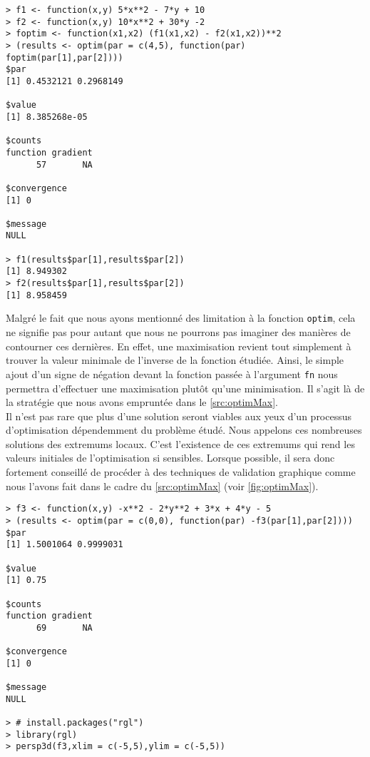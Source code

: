 \begin{lstlisting}[caption = Optimisation générique avec R,label=src:optim]
> f1 <- function(x,y) 5*x**2 - 7*y + 10
> f2 <- function(x,y) 10*x**2 + 30*y -2
> foptim <- function(x1,x2) (f1(x1,x2) - f2(x1,x2))**2
> (results <- optim(par = c(4,5), function(par) foptim(par[1],par[2])))
$par
[1] 0.4532121 0.2968149

$value
[1] 8.385268e-05

$counts
function gradient 
      57       NA 

$convergence
[1] 0

$message
NULL

> f1(results$par[1],results$par[2])
[1] 8.949302
> f2(results$par[1],results$par[2])
[1] 8.958459
\end{lstlisting}

\vspace{\baselineskip}
Malgré le fait que nous ayons mentionné des limitation à la fonction \texttt{optim}, cela ne signifie pas pour autant que nous ne pourrons pas imaginer des manières de contourner ces dernières. En effet, une maximisation revient tout simplement à trouver la valeur minimale de l'inverse de la fonction étudiée. Ainsi, le simple ajout d'un signe de négation devant la fonction passée à l'argument \texttt{fn} nous permettra d'effectuer une maximisation plutôt qu'une minimisation. Il s'agit là de la stratégie que nous avons empruntée dans le \autoref{src:optimMax}. \\

Il n'est pas rare que plus d'une solution seront viables aux yeux d'un processus d'optimisation dépendemment du problème étudé. Nous appelons ces nombreuses solutions des extremums locaux. C'est l'existence de ces extremums qui rend les valeurs initiales de l'optimisation si sensibles. Lorsque possible, il sera donc fortement conseillé de procéder à des techniques de validation graphique comme nous l'avons fait dans le cadre du \autoref{src:optimMax} (voir \autoref{fig:optimMax}). \\

\begin{lstlisting}[caption = Maximisation d'une fonction avec \texttt{optim},label=src:optimMax]
> f3 <- function(x,y) -x**2 - 2*y**2 + 3*x + 4*y - 5
> (results <- optim(par = c(0,0), function(par) -f3(par[1],par[2])))
$par
[1] 1.5001064 0.9999031

$value
[1] 0.75

$counts
function gradient 
      69       NA 

$convergence
[1] 0

$message
NULL

> # install.packages("rgl")
> library(rgl)
> persp3d(f3,xlim = c(-5,5),ylim = c(-5,5))
\end{lstlisting}

